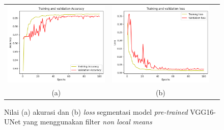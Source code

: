 \begin{enumerate}
	
	\begin{figure}[htbp]
		\centering
		\begin{tabular}{ccc}
			\includegraphics[scale=0.5]{bab4/acc-nlm-vggunet.png} &
			\includegraphics[scale=0.5]{bab4/loss-nlm-vggunet.png} & \\
			(a) & (b)    %
		\end{tabular}
		\caption{Nilai (a) akurasi dan (b) \textit{loss} segmentasi model \textit{pre-trained} VGG16-UNet yang menggunakan filter \textit{non local means}}
		\label{fig:performance-nlm-vggunet}
	\end{figure}
	

\end{enumerate}
